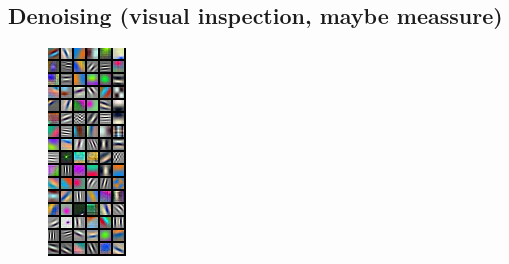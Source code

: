 \documentclass{article}
\begin{document}
\subsection{ Denoising (visual inspection, maybe meassure)}
\begin{figure}[ht]
  \begin{minipage}[b]{0.48\linewidth}
  	\includegraphics[width=\textwidth]{img/first.png}

\end{minipage}
\end{figure}
\end{document}
